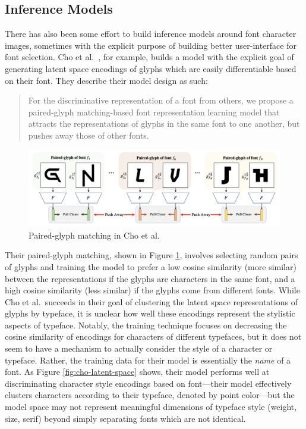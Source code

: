 \subsection{Inference Models}

There has also been some effort to build inference models around font character images, sometimes with the explicit purpose of building better user-interface for font selection. Cho et al.\ \cite{cho2022}, for example, builds a model with the explicit goal of generating latent space encodings of glyphs which are easily differentiable based on their font. They describe their model design as such:

\begin{quote}
    For the discriminative representation of a font from others, we propose a paired-glyph matching-based font representation learning model that attracts the representations of glyphs in the same font to one another, but pushes away those of other fonts.
\end{quote}

\begin{figure}
    \centering
    \includegraphics[width=1\textwidth]{images/cho-paired-glyph.png}
    \caption{Paired-glyph matching in Cho et al.\ \cite{cho2022}}
    \label{fig:cho-paired-glyph}
\end{figure}

Their paired-glyph matching, shown in Figure \ref{fig:cho-paired-glyph}, involves selecting random pairs of glyphs and training the model to prefer a low cosine similarity (more similar) between the representations if the glyphs are characters in the same font, and a high cosine similarity (less similar) if the glyphs come from different fonts. While Cho et al.\ succeeds in their goal of clustering the latent space representations of glyphs by typeface, it is unclear how well these encodings represent the stylistic aspects of typeface. Notably, the training technique focuses on decreasing the cosine similarity of encodings for characters of different typefaces, but it does not seem to have a mechanism to actually consider the style of a character or typeface. Rather, the training data for their model is essentially the \emph{name} of a font. As Figure \ref{fig:cho-latent-space} shows, their model performs well at discriminating character style encodings based on font---their model effectively clusters characters according to their typeface, denoted by point color---but the model space may not represent meaningful dimensions of typeface style (weight, size, serif) beyond simply separating fonts which are not identical.

